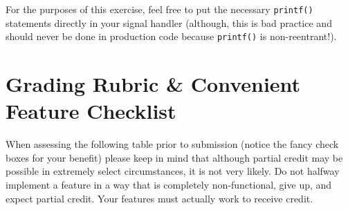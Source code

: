 \documentclass[10pt]{article}
\begin{document}
For the purposes of this exercise, feel free to put the necessary
\texttt{printf()} statements directly in your signal handler (although,
this is bad practice and should never be done in production code because
\texttt{printf()} is non-reentrant!).




\pagebreak

\section{Grading Rubric \& Convenient Feature Checklist}

When assessing the following table prior to submission (notice the fancy
check boxes for your benefit) please keep in
mind that although partial credit may be possible in extremely select
circumstances, it is not very likely. Do not halfway implement a feature
in a way that is completely non-functional, give up, and expect partial
credit.  Your features must actually work to receive credit.
\end{document}
